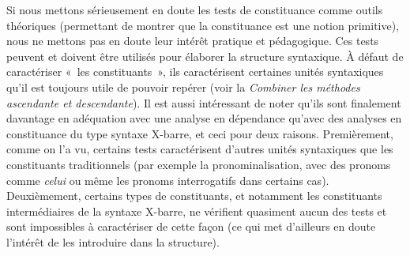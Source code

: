 {    Si nous mettons sérieusement en doute les tests de constituance comme outils théoriques (permettant de montrer que la constituance est une notion primitive), nous ne mettons pas en doute leur intérêt pratique et pédagogique. Ces tests peuvent et doivent être utilisés pour élaborer la structure syntaxique. À défaut de caractériser «~les constituants~», ils caractérisent certaines unités syntaxiques qu’il est toujours utile de pouvoir repérer (voir la  \textit{Combiner les méthodes ascendante et descendante}). Il est aussi intéressant de noter qu’ils sont finalement davantage en adéquation avec une analyse en dépendance qu’avec des analyses en constituance du type syntaxe X-barre, et ceci pour deux raisons. Premièrement, comme on l’a vu, certains tests caractérisent d’autres unités syntaxiques que les constituants traditionnels (par exemple la pronominalisation, avec des pronoms comme \textit{celui} ou même les pronoms interrogatifs dans certains cas). Deuxièmement, certains types de constituants, et notamment les constituants intermédiaires de la syntaxe X-barre, ne vérifient quasiment aucun des tests et sont impossibles à caractériser de cette façon (ce qui met d’ailleurs en doute l’intérêt de les introduire dans la structure).
}
